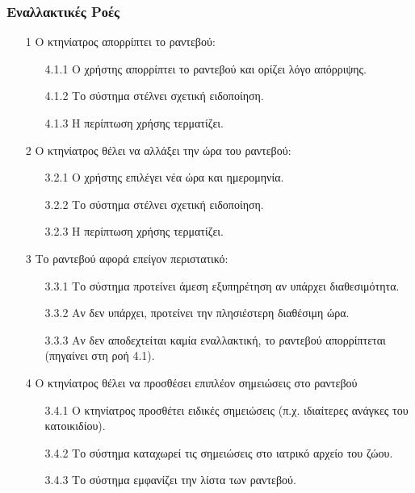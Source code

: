 \documentclass[12pt,a4paper,twoside]{book}
\begin{document}
\subsubsection{Εναλλακτικές Ροές}
\begin{enumerate}
  \item[1 ] Ο κτηνίατρος απορρίπτει το ραντεβού:
        \begin{enumerate}
          \item[4.1.1 ] Ο χρήστης απορρίπτει το ραντεβού και ορίζει λόγο απόρριψης. %
          \item[4.1.2 ] Το σύστημα στέλνει σχετική ειδοποίηση. %
          \item[4.1.3 ] Η περίπτωση χρήσης τερματίζει.
        \end{enumerate}
  \item[2 ] Ο κτηνίατρος θέλει να αλλάξει την ώρα του ραντεβού:
        \begin{enumerate}
          \item[3.2.1 ] Ο χρήστης επιλέγει νέα ώρα και ημερομηνία.
          \item[3.2.2 ] Το σύστημα στέλνει σχετική ειδοποίηση. %
          \item[3.2.3 ] Η περίπτωση χρήσης τερματίζει.
        \end{enumerate}
  \item[3 ] Το ραντεβού αφορά επείγον περιστατικό:
        \begin{enumerate}
          \item[3.3.1 ] Το σύστημα προτείνει άμεση εξυπηρέτηση αν υπάρχει διαθεσιμότητα. %
          \item[3.3.2 ] Αν δεν υπάρχει, προτείνει την πλησιέστερη διαθέσιμη ώρα. %
          \item[3.3.3 ] Αν δεν αποδεχτείται καμία εναλλακτική, το ραντεβού απορρίπτεται (πηγαίνει στη ροή 4.1). %
        \end{enumerate}
  \item[4 ] Ο κτηνίατρος θέλει να προσθέσει επιπλέον σημειώσεις στο ραντεβού
        \begin{enumerate}
          \item[3.4.1 ] Ο κτηνίατρος προσθέτει ειδικές σημειώσεις (π.χ. ιδιαίτερες ανάγκες του κατοικιδίου). %
          \item[3.4.2 ] Το σύστημα καταχωρεί τις σημειώσεις στο ιατρικό αρχείο του ζώου.
          \item[3.4.3 ] Το σύστημα εμφανίζει την λίστα των ραντεβού.

\end{enumerate}
\end{enumerate}
\end{document}
